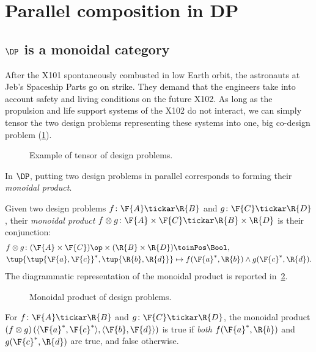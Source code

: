 \section{Parallel composition in DP}
\subsection{$\DP$ is a monoidal category}
\begin{example}
After the X101 spontaneously combusted in low Earth orbit, the astronauts at Jeb's Spaceship Parts go on strike. They demand that the engineers take into account safety and living conditions on the future X102. As long as the propulsion and life support systems of the X102 do not interact, we can simply tensor the two design problems representing these systems into one, big co-design problem (\cref{fig:examplemonoidal}).
\begin{figure}[h!]
\begin{center}
\end{center}
\caption{Example of tensor of design problems. \label{fig:examplemonoidal}}
\end{figure}
\end{example}
In $\DP$, putting two design problems in parallel corresponds to forming their \emph{monoidal product}. 

\begin{definition}
\label{def:monoidalproduct}
Given two design problems $f \colon \F{A} \tickar \R{B}$ and $g \colon \F{C} \tickar \R{D}$,
their \emph{monoidal product} $f\otimes g \colon \F{A} \times \F{C} \tickar \R{B} \times \R{D}$ is their conjunction:
\begin{equation}
\begin{aligned}
f \otimes g \colon (\F{A} \times \F{C})\op \times (\R{B} \times \R{D}) & \toinPos \Bool, \\
\tup{\tup{\F{a},\F{c}}^*,\tup{\R{b},\R{d}}} &\mapsto f(\F{a}^*,\R{b}) \wedge g(\F{c}^*,\R{d}). 
\end{aligned}
\end{equation}
The diagrammatic representation of the monoidal product is reported in~\cref{fig:dpmonoidal}.
\begin{figure}[h!]
\begin{center}
\end{center}
\caption{Monoidal product of design problems. \label{fig:dpmonoidal}}
\end{figure}
\end{definition}
\begin{remark}
For $f \colon \F{A} \tickar \R{B}$ and $g \colon \F{C} \tickar \R{D}$, the monoidal product $\left(f \otimes g\right)(\langle \F{a}^*, \F{c}^*\rangle, \langle \F{b},\F{d} \rangle)$ is true if \emph{both} $f(\F{a}^*,\R{b})$ and $g(\F{c}^*,\R{d})$ are true, and false otherwise.
\end{remark}

